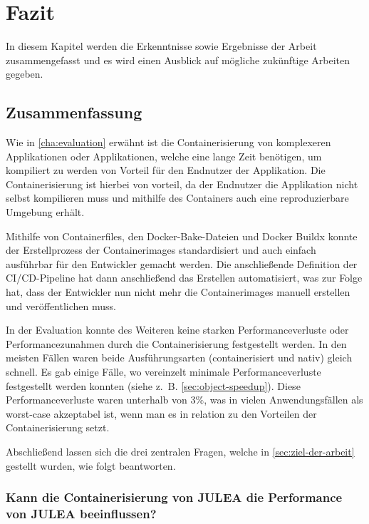 \chapter{Fazit} \label{cha:conclusion}

In diesem Kapitel werden die Erkenntnisse sowie Ergebnisse der Arbeit zusammengefasst und es wird einen Ausblick auf mögliche zukünftige Arbeiten gegeben. 

\section{Zusammenfassung}

Wie in \cref{cha:evaluation} erwähnt ist die Containerisierung von komplexeren Applikationen oder Applikationen, welche eine lange Zeit benötigen, um kompiliert zu werden von Vorteil für den Endnutzer der Applikation. Die Containerisierung ist hierbei von vorteil, da der Endnutzer die Applikation nicht selbst kompilieren muss und mithilfe des Containers auch eine reproduzierbare Umgebung erhält. 

Mithilfe von Containerfiles, den Docker-Bake-Dateien und Docker Buildx konnte der Erstellprozess der Containerimages standardisiert und auch einfach ausführbar für den Entwickler gemacht werden. Die anschließende Definition der CI/CD-Pipeline hat dann anschließend das Erstellen automatisiert, was zur Folge hat, dass der Entwickler nun nicht mehr die Containerimages manuell erstellen und veröffentlichen muss. 

In der Evaluation konnte des Weiteren keine starken Performanceverluste oder Performancezunahmen durch die Containerisierung festgestellt werden. In den meisten Fällen waren beide Ausführungsarten (containerisiert und nativ) gleich schnell. Es gab einige Fälle, wo vereinzelt minimale Performanceverluste festgestellt werden konnten (siehe z. B. \cref{sec:object-speedup}). Diese Performanceverluste waren unterhalb von $3\%$, was in vielen Anwendungsfällen als worst-case akzeptabel ist, wenn man es in relation zu den Vorteilen der Containerisierung setzt.

Abschließend lassen sich die drei zentralen Fragen, welche in \cref{sec:ziel-der-arbeit} gestellt wurden, wie folgt beantworten.

\subsection{Kann die Containerisierung von JULEA die Performance von JULEA beeinflussen?}


